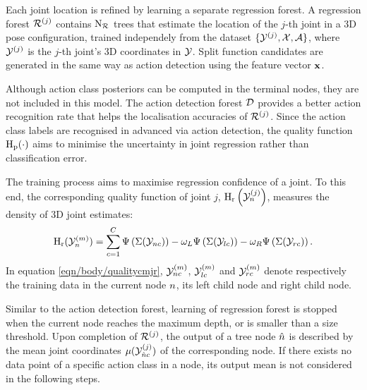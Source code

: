 Each joint location is refined by learning a separate regression forest.  
A regression forest $\mathcal{R}^{(j)}$ contains $\mathrm{N_{\mathcal{R}}}$ trees that estimate the location of the $j$-th joint in a 3D pose configuration, trained independely from the dataset $\{ \mathcal{Y}^{(j)}, \mathcal{X}, \mathcal{A}\}$, where $\mathcal{Y}^{(j)}$ is the $j$-th joint's 3D coordinates in $\mathcal{Y}$. 
Split function candidates are generated in the same way as action detection using the feature vector $\mathbf{x}$. 

Although action class posteriors can be computed in the terminal nodes, they are not included in this model. The action detection forest $\mathcal{D}$ provides a better action recognition rate that helps the localisation accuracies of $\mathcal{R}^{(j)}$. Since the action class labels are recognised in advanced via action detection, the quality function $\mathrm{H_{p}}(\cdot)$ aims to minimise the uncertainty in joint regression rather than classification error.

The training process aims to maximise regression confidence of a joint. To this end, the corresponding quality function of joint $j$, $\mathrm{H_{r}}\left(\mathcal{Y}^{(j)}_{n}\right)$, measures the density of 3D joint estimates: 
\begin{equation}
	\label{eqn/body/qualitycmjr}
	\mathrm{H_{r}}(\mathcal{Y}^{(m)}_{n}) = \displaystyle\sum_{c = 1}^{C} \Psi\left(\Sigma(\mathcal{Y}_{n c})\right) - \omega_{L}\Psi\left(\Sigma(\mathcal{Y}_{lc})\right) - \omega_{R}\Psi\left(\Sigma(\mathcal{Y}_{rc})\right).
\end{equation}
In equation \ref{eqn/body/qualitycmjr}, $\mathcal{Y}^{(m)}_{n c}$, $\mathcal{Y}^{(m)}_{l c}$ and $\mathcal{Y}^{(m)}_{r c}$ denote respectively the training data in the current node $n$, its left child node and right child node.  

Similar to the action detection forest, learning of regression forest is stopped when the current node reaches the maximum depth, or is smaller than a size threshold.  
Upon completion of $\mathcal{R}^{(j)}$, the output of a tree node ${\hat{n}}$ is described by the mean joint coordinates $\mu(\mathcal{Y}^{(j)}_{{\hat{n}} c})$ of the corresponding node. If there exists no data point of a specific action class in a node, its output mean is not considered in the following steps. 

